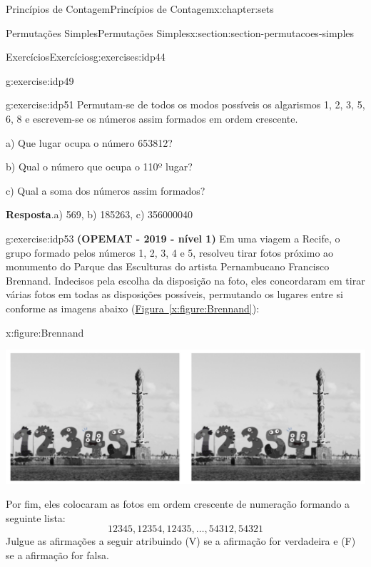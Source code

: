 \documentclass[oneside,10pt,]{book}
\newcommand{\blocktitlefont}{\relax}
\newcommand{\xreffont}{\relax}
\newcommand{\terminology}[1]{\textbf{#1}}
\numberwithin{equation}{section}
\begin{document}
\begin{chapterptx}{Princípios de Contagem}{}{Princípios de Contagem}{}{}{x:chapter:sets}
\begin{sectionptx}{Permutações Simples}{}{Permutações Simples}{}{}{x:section:section-permutacoes-simples}
\begin{exercises-subsection}{Exercícios}{}{Exercícios}{}{}{g:exercises:idp44}
\begin{divisionexercise}{3}{}{}{g:exercise:idp49}
\end{divisionexercise}%
\begin{divisionexercise}{4}{}{}{g:exercise:idp51}%
Permutam-se de todos os modos possíveis os algarismos 1, 2, 3, 5, 6, 8 e escrevem-se os números assim formados em ordem crescente.%
\par
a) Que lugar ocupa o número 653812?%
\par
b) Qual o número que ocupa o 110º lugar?%
\par
c) Qual a soma dos números assim formados?%
\par\smallskip%
\noindent\textbf{\blocktitlefont Resposta}.\hypertarget{g:answer:idp52}{}\quad{}a) 569, b) 185263, c) 356000040%
\end{divisionexercise}%
\begin{divisionexercise}{5}{}{}{g:exercise:idp53}%
\terminology{(OPEMAT - 2019 - nível 1)} Em uma viagem a Recife, o grupo formado pelos números 1, 2, 3, 4 e 5, resolveu tirar fotos próximo ao monumento do Parque das Esculturas do artista Pernambucano Francisco Brennand. Indecisos pela escolha da disposição na foto, eles concordaram em tirar várias fotos em todas as disposições possíveis, permutando os lugares entre si conforme as imagens abaixo (\hyperref[x:figure:Brennand]{Figura~{\xreffont\ref{x:figure:Brennand}}}):%
\begin{figureptx}{}{x:figure:Brennand}{}%
\begin{image}{0.05}{0.9}{0.05}%
\includegraphics[width=\linewidth]{images/Brennand}
\end{image}%
\tcblower
\end{figureptx}%
Por fim, eles colocaram as fotos em ordem crescente de numeração formando a seguinte lista:%
%
\begin{equation*}
1 2 3 4 5 , 1 2 3 5 4 , 1 2 4 3 5 , \ldots , 5 4 3 1 2 , 5 4 3 2 1
\end{equation*}
Julgue as afirmações a seguir atribuindo (V) se a afirmação for verdadeira e (F) se a afirmação for falsa.%
\par

\end{divisionexercise}
\end{exercises-subsection}
\end{sectionptx}
\end{chapterptx}
\end{document}
